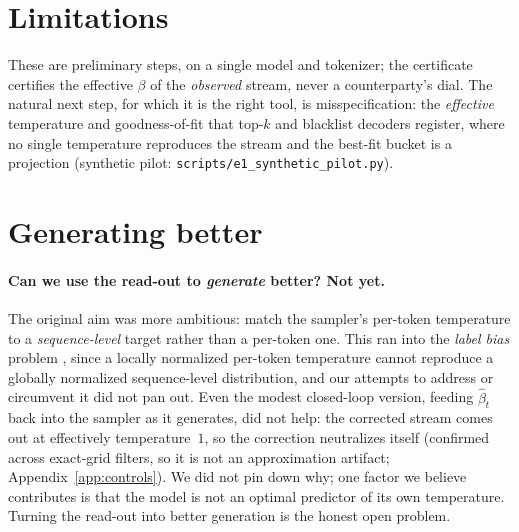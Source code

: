\documentclass[11pt]{article}
\begin{document}
\appendix
\section{Limitations}\label{sec:limits}
These are preliminary steps, on a single model and tokenizer; the certificate
certifies the effective $\beta$ of the \emph{observed} stream, never a
counterparty's dial. The natural next step, for which it is the right tool, is
misspecification: the \emph{effective} temperature and goodness-of-fit that
top-$k$ and blacklist decoders register, where no single temperature reproduces
the stream and the best-fit bucket is a projection (synthetic pilot:
\texttt{scripts/e1\_synthetic\_pilot.py}).

\section{Generating better}\label{sec:gen}
\paragraph{Can we use the read-out to \emph{generate} better? Not yet.}
The original aim was more ambitious: match the sampler's per-token temperature to
a \emph{sequence-level} target rather than a per-token one. This ran into the
\emph{label bias} problem \citep{andor2016globally}, since a locally normalized
per-token temperature cannot reproduce a globally normalized sequence-level
distribution, and our attempts to address or circumvent it did not pan out. Even
the modest closed-loop version, feeding $\hat\beta_t$ back into the sampler as it
generates, did not help: the corrected stream comes out at effectively
temperature~$1$, so the correction neutralizes itself (confirmed across
exact-grid filters, so it is not an approximation artifact;
Appendix~\ref{app:controls}). We did not pin down why; one factor we believe
contributes is that the model is not an optimal predictor of its own
temperature. Turning the read-out into better generation is the honest open
problem.

\end{document}
